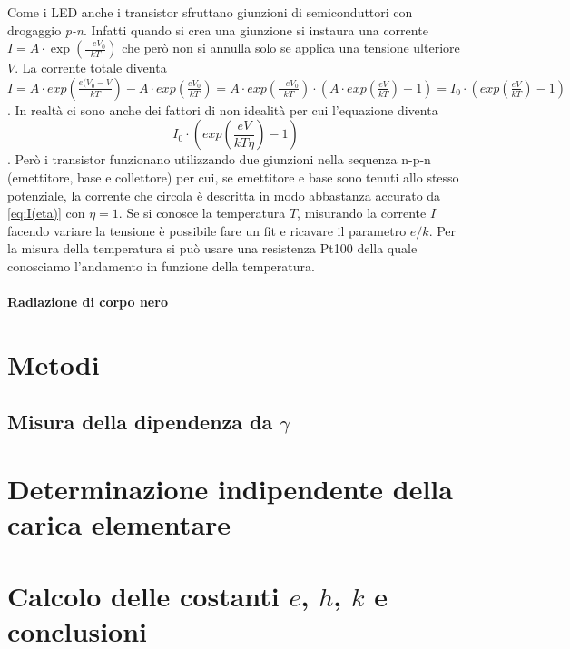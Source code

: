 \documentclass[a4paper, varvw, nofootinbib]{revtex4-2}
\begin{document}
Come i LED anche i transistor sfruttano giunzioni di semiconduttori con drogaggio \emph{p-n}. Infatti quando si crea una giunzione si instaura una corrente $I=A\cdot \exp(\frac{-eV_0}{kT})$ che però non si annulla solo se applica una tensione ulteriore $V$. La corrente totale diventa $I=A\cdot exp(\frac{e(V_0-V}{kT})-A\cdot exp(\frac{eV_0}{kT}) = A\cdot exp(\frac{-eV_0}{kT})\cdot(A\cdot exp(\frac{eV}{kT})-1) = I_0\cdot(exp(\frac{eV}{kT})-1)$. In realtà ci sono anche dei fattori di non idealità per cui l'equazione diventa \begin{equation}  I_0\cdot(exp(\frac{eV}{kT\eta})-1)\label{eq:I(eta)} \end{equation}. Però i transistor funzionano utilizzando due giunzioni nella sequenza n-p-n (emettitore, base e collettore) per cui, se emettitore e base sono tenuti allo stesso potenziale, la corrente che circola è descritta in modo abbastanza accurato da \ref{eq:I(eta)} con $\eta=1$. Se si conosce la temperatura $T$, misurando la corrente $I$ facendo variare la tensione è possibile fare un fit e ricavare il parametro $e/k$. Per la misura della temperatura si può usare una resistenza Pt100 della quale conosciamo l'andamento in funzione della temperatura. 

\paragraph*{Radiazione di corpo nero}

\section{Metodi}\label{sec:black_body_methods}

\subsection{Misura della dipendenza da $\gamma$}

\section{Determinazione indipendente della carica elementare}\label{sec:millikan}

\section{Calcolo delle costanti $e$, $h$, $k$ e conclusioni}\label{sec:combined_data}


\end{document}
